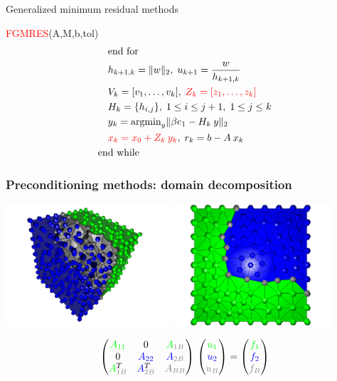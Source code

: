 \documentclass[handout]{beamer}
{
\usepackage{fullpage}
\usepackage{hyperref}
\usepackage{amssymb} 
}
\newcommand{\pmat}[1]{\begin{pmatrix}#1\end{pmatrix}}
\newcommand{\blue}[1]{\textcolor{blue}{#1}}
\newcommand{\green}[1]{\textcolor{green}{#1}}
\newcommand{\gray}[1]{\textcolor{gray}{#1}}
\begin{document}
\begin{frame}{Generalized minimum residual methods}
{\begin{minipage}{0.48\linewidth}
\begin{block}{\footnotesize {\textcolor{red}{FGMRES}(A,M,b,tol)}}
\begin{align*}
   &\quad \text{end for} \\
   &\quad h_{k+1,k} = \Vert w \Vert_2, \; u_{k+1} = \frac{w}{h_{k+1,k}} \\
   &\quad V_k = [v_1, \ldots, v_k], \; \textcolor{red}{Z_k = [z_1, \ldots, z_k]} \\ 
   &\quad H_k = \{h_{i,j}\}, \; 1\le i \le j+1, \; 1 \le j \le k \\
   &\quad y_k = \text{argmin}_y \Vert \beta e_1 - H_k \:  y \Vert_2 \\
   &\quad \textcolor{red}{x_k = x_0 + Z_k \: y_k}, \; r_k = b-A \: x_k \\
   &\text{end while}
\end{align*}
\end{block}
\end{minipage}
}
\end{frame}



\begin{frame}
\frametitle{Preconditioning methods: domain decomposition}

\begin{center}
  \includegraphics[width=6.0cm]{figures/3Ddomain-2parts.pdf}
  \hspace*{-1.0cm}
  \includegraphics[width=6.0cm]{figures/2subdomain.pdf}
\end{center}
\Large{
\[
\pmat
{
  \green{A_{11}}    & 0         & \green{A}_{\gray{1B}} \\
  0         & \blue{A_{22}}     & \blue{A}_{\gray{2B}}  \\
  \green{A}^T_{\gray{1B}}  & \blue{A}^T_{\gray{2B}}  & \gray{A_{BB}}
}
\,
\pmat
{
  \green{u_1} \\
  \blue{u_2}  \\
  \gray{u_B}
}
=
\pmat
{
  \green{f_1} \\
  \blue{f_2}  \\
  \gray{f_B}
}
\]}
\end{frame}
\end{document}

